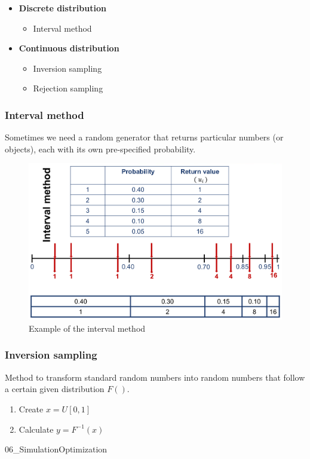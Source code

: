 \begin{itemize}
	\tightlist
	\item \textbf{Discrete distribution}
	\begin{itemize}
		\tightlist
		\item Interval method
	\end{itemize}
	\item \textbf{Continuous distribution}
	\begin{itemize}
		\tightlist
		\item Inversion sampling
		\item Rejection sampling
	\end{itemize}
\end{itemize}

\subsubsection{Interval method}
Sometimes we need a random generator that returns particular numbers (or
objects), each with its own pre-specified probability.

\begin{figure}[H]
	\centering
	\includegraphics[width=.6\textwidth]{figures/IntervalMethod.png}
	\caption{Example of the interval method}
\end{figure}

\subsubsection{Inversion sampling}
Method to transform standard random numbers into random numbers
that follow a certain given distribution $F()$.

\begin{enumerate}
	\tightlist
	\item Create $x = U[0,1]$
	\item Calculate $y = F^{-1}(x)$
\end{enumerate}


{06_SimulationOptimization}
